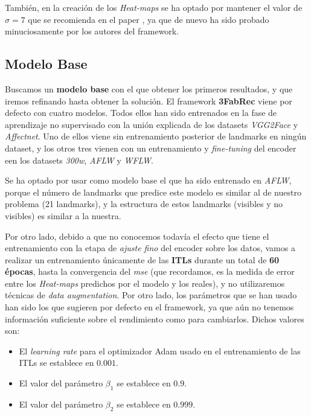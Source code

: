         \medskip

        \noindent También, en la creación de los \textit{Heat-maps} se ha optado por mantener el valor de $\sigma =7$ que se recomienda en el paper \cite{browatzki20203fabrec}, ya que de nuevo ha sido probado minuciosamente por los autores del framework.
    
    \subsection{Modelo Base}
        \noindent Buscamos un \textbf{modelo base} con el que obtener los primeros resultados, y que iremos refinando hasta obtener la solución. El framework \textbf{3FabRec} viene por defecto con cuatro modelos. Todos ellos han sido entrenados en la fase de aprendizaje no supervisado con la unión explicada de los datasets \textit{VGG2Face} y \textit{Affectnet}. Uno de ellos viene sin entrenamiento posterior de landmarks en ningún dataset, y los otros tres vienen con un entrenamiento y \textit{fine-tuning} del encoder een los datasets \textit{300w}, \textit{AFLW} y \textit{WFLW}.

        \medskip

        \noindent Se ha optado por usar como modelo base el que ha sido entrenado en \textit{AFLW}, porque el número de landmarks que predice este modelo es similar al de nuestro problema (21 landmarks), y la estructura de estos landmarks (visibles y no visibles) es similar a la nuestra.

        \medskip

        \noindent Por otro lado, debido a que no conocemos todavía el efecto que tiene el entrenamiento con la etapa de \textit{ajuste fino} del encoder sobre los datos, vamos a realizar un entrenamiento únicamente de las \textbf{ITLs} durante un total de \textbf{60 épocas}, hasta la convergencia del \textit{mse} (que recordamos, es la medida de error entre los \textit{Heat-maps} predichos por el modelo y los reales), y no utilizaremos técnicas de \textit{data augmentation}. Por otro lado, los parámetros que se han usado han sido los que sugieren por defecto en el framework, ya que aún no tenemos información suficiente sobre el rendimiento como para cambiarlos. Dichos valores son: 

        \begin{itemize}
            \item El \textit{learning rate} para el optimizador Adam usado en el entrenamiento de las ITLs se establece en $0.001$. 
            \item El valor del parámetro $\beta_1$ se establece en $0.9$.
            \item El valor del parámetro $\beta_2$ se establece en $0.999$.
        \end{itemize}

